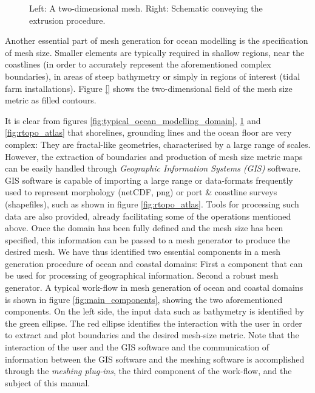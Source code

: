 \begin{figure}[htb!]\begin{center}
\caption[A two dimensional mesh and schematic of the extrusion procedure.]{Left: A two-dimensional mesh. Right: Schematic conveying the extrusion procedure.}
\label{fig:2d_domain_and_extrusion}
\end{center}\end{figure}
\par
Another essential part of mesh generation for ocean modelling is the specification of mesh size. Smaller elements are typically required in shallow regions, near the coastlines (in order to accurately represent the aforementioned complex boundaries), in areas of steep bathymetry or simply in regions of interest (\eg tidal farm installations). Figure \ref{} shows the two-dimensional field of the mesh size metric as filled contours.
\par
It is clear from figures \ref{fig:typical_ocean_modelling_domain}, \ref{fig:2d_domain_and_extrusion} and \ref{fig:rtopo_atlas} that shorelines, grounding lines and the ocean floor are very complex: They are fractal-like geometries, characterised by a large range of scales. However, the extraction of boundaries and production of mesh size metric maps can be easily handled through \emph{Geographic Information Systems (GIS)} software. GIS software is capable of importing a large range or data-formats frequently used to represent morphology (\eg netCDF, png) or port \& coastline surveys (\eg shapefiles), such as shown in figure \ref{fig:rtopo_atlas}. Tools for processing such data are also provided, already facilitating some of the operations mentioned above.
Once the domain has been fully defined and the mesh size has been specified, this information can be passed to a mesh generator to produce the desired mesh. We have thus identified two essential components in a mesh generation procedure of ocean and coastal domains: First a component that can be used for processing of geographical information. Second a robust mesh generator. A typical work-flow in mesh generation of ocean and coastal domains is shown in figure \ref{fig:main_components}, showing the two aforementioned components. On the left side, the input data such as bathymetry is identified by the green ellipse. The red ellipse identifies the interaction with the user in order to extract and plot boundaries and the desired mesh-size metric. Note that the interaction of the user and the GIS software and the communication of information between the GIS software and the meshing software is accomplished through the \emph{meshing plug-ins}, the third component of the work-flow, and the subject of this manual.


